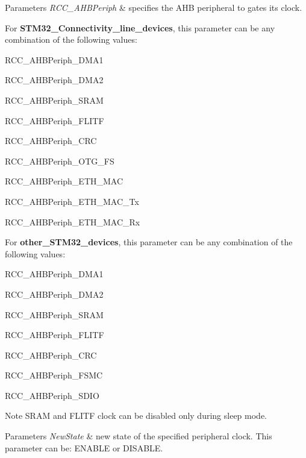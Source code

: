 \begin{DoxyParams}{Parameters}
{\em R\+C\+C\+\_\+\+A\+H\+B\+Periph} & specifies the A\+HB peripheral to gates its clock.\\
\hline
\end{DoxyParams}
For {\bfseries S\+T\+M32\+\_\+\+Connectivity\+\_\+line\+\_\+devices}, this parameter can be any combination of the following values\+: \begin{DoxyItemize}
\item R\+C\+C\+\_\+\+A\+H\+B\+Periph\+\_\+\+D\+M\+A1 \item R\+C\+C\+\_\+\+A\+H\+B\+Periph\+\_\+\+D\+M\+A2 \item R\+C\+C\+\_\+\+A\+H\+B\+Periph\+\_\+\+S\+R\+AM \item R\+C\+C\+\_\+\+A\+H\+B\+Periph\+\_\+\+F\+L\+I\+TF \item R\+C\+C\+\_\+\+A\+H\+B\+Periph\+\_\+\+C\+RC \item R\+C\+C\+\_\+\+A\+H\+B\+Periph\+\_\+\+O\+T\+G\+\_\+\+FS \item R\+C\+C\+\_\+\+A\+H\+B\+Periph\+\_\+\+E\+T\+H\+\_\+\+M\+AC \item R\+C\+C\+\_\+\+A\+H\+B\+Periph\+\_\+\+E\+T\+H\+\_\+\+M\+A\+C\+\_\+\+Tx \item R\+C\+C\+\_\+\+A\+H\+B\+Periph\+\_\+\+E\+T\+H\+\_\+\+M\+A\+C\+\_\+\+Rx\end{DoxyItemize}
For {\bfseries other\+\_\+\+S\+T\+M32\+\_\+devices}, this parameter can be any combination of the following values\+: \begin{DoxyItemize}
\item R\+C\+C\+\_\+\+A\+H\+B\+Periph\+\_\+\+D\+M\+A1 \item R\+C\+C\+\_\+\+A\+H\+B\+Periph\+\_\+\+D\+M\+A2 \item R\+C\+C\+\_\+\+A\+H\+B\+Periph\+\_\+\+S\+R\+AM \item R\+C\+C\+\_\+\+A\+H\+B\+Periph\+\_\+\+F\+L\+I\+TF \item R\+C\+C\+\_\+\+A\+H\+B\+Periph\+\_\+\+C\+RC \item R\+C\+C\+\_\+\+A\+H\+B\+Periph\+\_\+\+F\+S\+MC \item R\+C\+C\+\_\+\+A\+H\+B\+Periph\+\_\+\+S\+D\+IO\end{DoxyItemize}
\begin{DoxyNote}{Note}
S\+R\+AM and F\+L\+I\+TF clock can be disabled only during sleep mode. 
\end{DoxyNote}

\begin{DoxyParams}{Parameters}
{\em New\+State} & new state of the specified peripheral clock. This parameter can be\+: E\+N\+A\+B\+LE or D\+I\+S\+A\+B\+LE. \\
\hline
\end{DoxyParams}

